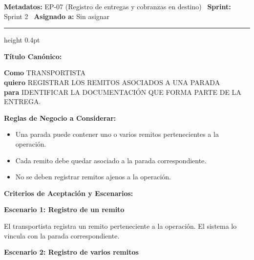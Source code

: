\documentclass[a4paper,9pt]{article}
\begin{document}
\begin{tcolorbox}[hucard, title={\textbf{HU-36: REGISTRO DE REMITOS} \hfill \scriptsize \colorbox{redstatus}{\textbf{\ Rejected\ }} \quad \colorbox{white}{\textcolor{primarydark}{\textbf{\ 3 pts\ }}}}]
\vspace{-1pt}
\noindent\textbf{\footnotesize Metadatos:} EP-07 (Registro de entregas y cobranzas en destino) \textbar\ \textbf{Sprint:} Sprint 2 \textbar\ \textbf{Asignado a:} Sin asignar\par\vspace{2pt}
\hrule height 0.4pt\par\vspace{3pt}
\noindent\textbf{\footnotesize Título Canónico:}\par\vspace{1pt}
{\small \textbf{Como} TRANSPORTISTA \\ \textbf{quiero} REGISTRAR LOS REMITOS ASOCIADOS A UNA PARADA \\ \textbf{para} IDENTIFICAR LA DOCUMENTACIÓN QUE FORMA PARTE DE LA ENTREGA.}\par\vspace{3pt}
\noindent\textbf{\footnotesize Reglas de Negocio a Considerar:}\par\vspace{1pt}
{\footnotesize
\begin{itemize}[leftmargin=12pt, nosep, itemsep=1.5pt, topsep=1pt]
\item Una parada puede contener uno o varios remitos pertenecientes a la operación.
\item Cada remito debe quedar asociado a la parada correspondiente.
\item No se deben registrar remitos ajenos a la operación.
\end{itemize}
}\par\vspace{3pt}
\noindent\textbf{\footnotesize Criterios de Aceptación y Escenarios:}\par\vspace{2pt}
{\footnotesize
\noindent\textbf{\textcolor{secondarydark}{Escenario 1:  Registro de un remito}}\par\vspace{1pt}
El transportista registra un remito perteneciente a la operación. El sistema lo vincula con la parada correspondiente.\par\vspace{2.5pt}
\noindent\textbf{\textcolor{secondarydark}{Escenario 2:  Registro de varios remitos}}\par\vspace{1pt}
}
\end{tcolorbox}
\end{document}
